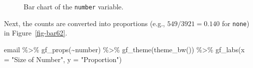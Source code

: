 \documentclass[
  letterpaper,
  DIV=11,
  numbers=noendperiod]{scrreprt}
\newenvironment{Shaded}{\begin{snugshade}}{\end{snugshade}}
\newcommand{\AttributeTok}[1]{\textcolor[rgb]{0.40,0.45,0.13}{#1}}
\newcommand{\FunctionTok}[1]{\textcolor[rgb]{0.28,0.35,0.67}{#1}}
\newcommand{\NormalTok}[1]{\textcolor[rgb]{0.00,0.23,0.31}{#1}}
\newcommand{\SpecialCharTok}[1]{\textcolor[rgb]{0.37,0.37,0.37}{#1}}
\newcommand{\StringTok}[1]{\textcolor[rgb]{0.13,0.47,0.30}{#1}}
\begin{document}
\begin{figure}[H]


\caption{\label{fig-bar61}Bar chart of the \texttt{number} variable.}

\end{figure}%

Next, the counts are converted into proportions (e.g.,
\(549 / 3921 = 0.140\) for \texttt{none}) in Figure~\ref{fig-bar62}.

\begin{Shaded}
\begin{Highlighting}[]
\NormalTok{email }\SpecialCharTok{\%\textgreater{}\%}
  \FunctionTok{gf\_props}\NormalTok{(}\SpecialCharTok{\textasciitilde{}}\NormalTok{number) }\SpecialCharTok{\%\textgreater{}\%}
  \FunctionTok{gf\_theme}\NormalTok{(}\FunctionTok{theme\_bw}\NormalTok{()) }\SpecialCharTok{\%\textgreater{}\%}
  \FunctionTok{gf\_labs}\NormalTok{(}\AttributeTok{x =} \StringTok{"Size of Number"}\NormalTok{, }\AttributeTok{y =} \StringTok{"Proportion"}\NormalTok{)}
\end{Highlighting}
\end{Shaded}
\end{document}
